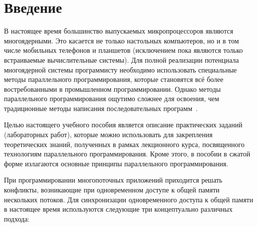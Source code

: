 \section*{Введение}

В настоящее время большинство выпускаемых микропроцессоров являются многоядерными. Это касается не только настольных компьютеров, но и в том числе мобильных телефонов и планшетов (исключением пока являются только встраиваемые вычислительные системы). Для полной реализации потенциала многоядерной системы программисту необходимо использовать специальные методы параллельного программирования, которые становятся всё более востребованными в промышленном программировании. Однако методы параллельного программирования ощутимо сложнее для освоения, чем традиционные методы написания последовательных программ~\cite{Galiakhmetova2019}.

Целью настоящего учебного пособия является описание практических заданий (лабораторных работ), которые можно использовать для закрепления теоретических знаний, полученных в рамках лекционного курса, посвященного технологиям параллельного программирования. Кроме этого, в пособии в сжатой форме излагаются основные принципы параллельного программирования.%

При программировании многопоточных приложений приходится решать конфликты, возникающие при одновременном доступе к общей памяти нескольких потоков. Для синхронизации одновременного доступа к общей памяти в настоящее время используются следующие три концептуально различных подхода:

